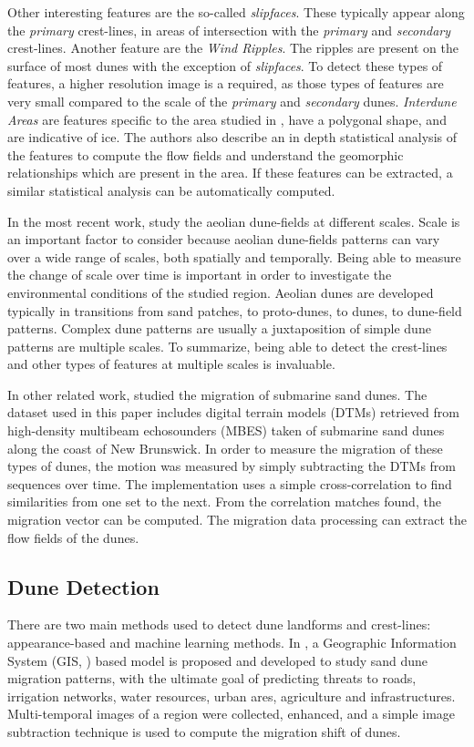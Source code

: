 Other interesting features are the so-called \emph{slipfaces}. These typically appear along the \emph{primary} crest-lines, in areas of intersection with the \emph{primary} and \emph{secondary} crest-lines. Another feature are the \emph{Wind Ripples}. The ripples are present on the surface of most dunes with the exception	of \emph{slipfaces}. To detect	these types of features, a higher resolution image is a required, as those types of features are very small compared to the scale of the \emph{primary} and \emph{secondary}	dunes. \emph{Interdune Areas} are features specific to the area studied in \cite{Ewing_Peyret_Kocurek_Bourke},	have a polygonal shape, and are indicative of ice. The authors also describe an in depth statistical analysis of the features to compute the flow fields and understand the geomorphic relationships which are present in the area. If these features can be extracted, a similar statistical analysis can be automatically computed.

In the most recent work, \cite{Multi_spatial_analysis_aeolian_dune_field_patterns} study the aeolian dune-fields at different scales. Scale is an important factor to consider because aeolian dune-fields patterns can vary over a wide range of scales, both spatially and temporally. Being able to measure the change of scale over time is important in order to investigate the environmental conditions of the studied region. Aeolian dunes are developed typically in transitions from sand patches, to proto-dunes, to dunes, to dune-field patterns. Complex dune patterns are usually a juxtaposition of simple dune patterns are multiple scales. To summarize, being able to detect the crest-lines and other types of features at multiple scales is invaluable.

In other related work, \cite{Application_spatial_cross_correlation_detection_submarine_dunes} studied the migration of submarine sand dunes. The dataset used in this paper includes digital terrain models (DTMs) retrieved from high-density multibeam echosounders (MBES) taken of submarine sand dunes along the coast of New Brunswick. In order to measure the migration of these types of dunes, the motion was measured by simply subtracting the DTMs from sequences over time. The implementation uses a simple cross-correlation to find similarities from one set to the next. From the correlation matches found, the migration vector can be computed. The migration data processing can extract the flow fields of the dunes.

\subsection*{Dune Detection}
There are two main methods used to detect dune landforms and crest-lines: appearance-based and machine learning methods. In \cite{2012_automated_extraction_sand_dunes_egypt}, a Geographic Information System (GIS, \cite{gis_article}) based model is proposed and developed to study sand dune migration patterns, with the ultimate goal of predicting threats to roads, irrigation networks, water resources, urban ares, agriculture and infrastructures. Multi-temporal images of a region were collected, enhanced, and a simple image subtraction technique is used to compute the migration shift of dunes.

